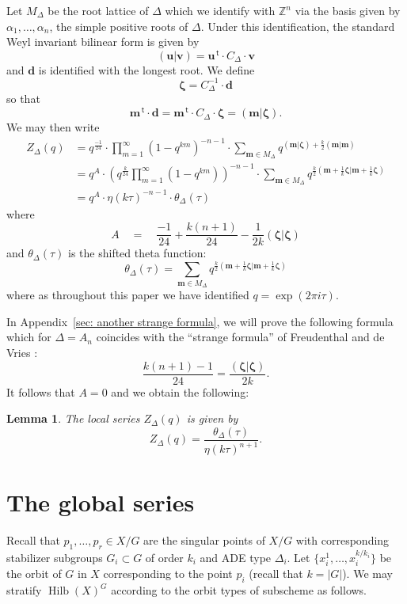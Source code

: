 \documentclass{amsart}
\newtheorem{lemma}[theorem]{Lemma}
\theoremstyle{definition}
\newcommand{\ZZ} {{\mathbb Z}}		%
\renewcommand{\top}{\,\mathsf{t}}
\newcommand{\mvec}{\bm{m}}
\newcommand{\zetavec}{\bm{\zeta }}
\newcommand{\dvec}{\bm{d }}
\newcommand{\uvec}{\bm{u }}
\newcommand{\vvec}{\bm{v }}
\newcommand{\Hilb}{\operatorname{Hilb}}
\begin{document}
Let $M_{\Delta}$ be the root lattice of $\Delta$ which we identify
with $\ZZ^{n}$ via the basis given by $\alpha_{1},\dotsc ,\alpha_{n}$,
the simple positive roots of $\Delta$. Under this identification, the
standard Weyl invariant bilinear form is given by
\[
(\uvec |\vvec ) = \uvec^{\top}\cdot C_{\Delta}\cdot \vvec 
\]
and $\dvec$ is identified with the longest root. 
We define
\[
\zetavec = C_{\Delta}^{-1} \cdot \dvec 
\]
so that 
\[
\mvec^{\top}\cdot \dvec = \mvec^{\top}\cdot C_{\Delta} \cdot \zetavec
= (\mvec |\zetavec ).
\]
We may then write
\begin{align*}
Z_{\Delta}(q)& = q^{\frac{-1}{24}}\cdot
\prod_{m=1}^{\infty}(1-q^{km})^{-n-1}\cdot \sum _{\mvec \in M_{\Delta}} q^{(\mvec |\zetavec )+\frac{k}{2}(\mvec |\mvec)}\\
&= q^{A} \cdot \left(q^{\frac{k}{24}}\prod_{m=1}^{\infty}(1-q^{km})
\right)^{-n-1} \cdot \sum_{\mvec \in M_{\Delta}} q^{\frac{k}{2}\left(\mvec +\frac{1}{k}\zetavec |\mvec +\frac{1}{k}\zetavec  \right)}\\
& = q^{A}\cdot  \eta (k\tau )^{-n-1}\cdot  \theta_{\Delta} (\tau )
\end{align*}
where 
\[
A \quad = \quad \frac{-1}{24} + \frac{k(n+1)}{24} - \frac{1}{2k}(\zetavec
|\zetavec )
\]
and $\theta_{\Delta}(\tau )$ is the shifted theta function:
\[
\theta_{\Delta}(\tau ) = \sum_{\mvec \in M_{\Delta}} q^{\frac{k}{2}\left(\mvec +\frac{1}{k}\zetavec |\mvec +\frac{1}{k}\zetavec  \right)}
\]
where as throughout this paper we have identified $q=\exp\left(2\pi i\tau  \right)$.

In Appendix~\ref{sec: another strange formula}, we will prove the
following formula which for $\Delta =A_{n}$ coincides with the
``strange formula'' of Freudenthal and de Vries
\cite{freudenthal1969linear}:
\[
 \frac{k(n+1)-1}{24}  = \frac{(\zetavec |\zetavec )}{2k}.
\]
It follows that $A=0$ and we obtain the following:
\begin{lemma}\label{lem: local series as theta/eta} The local series
$Z_{\Delta}(q)$ is given by
\[
Z_{\Delta}(q) = \frac{\theta_{\Delta}(\tau )}{\eta (k\tau )^{n+1}}. 
\]
\end{lemma}


\section{The global series}\label{sec: the global series}

Recall that $p_{1},\dotsc ,p_{r}\in X/G$ are the singular points of
$X/G$ with corresponding stabilizer subgroups $G_{i}\subset G$ of
order $k_{i}$ and ADE type $\Delta_{i}$. Let $\{x_{i}^{1},\dotsc
,x_{i}^{k/k_{i}} \}$ be the orbit of $G$ in $X$ corresponding to the
point $p_{i}$ (recall that $k=|G|$).  We may stratify $\Hilb (X)^{G}$
according to the orbit types of subscheme as follows.
\end{document}
